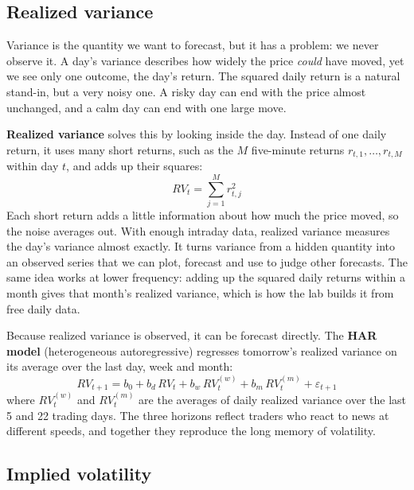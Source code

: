 \subsection{Realized variance}
\label{sec:10-rv}

Variance is the quantity we want to forecast, but it has a problem: we never observe it. A day's variance describes how widely the price \emph{could} have moved, yet we see only one outcome, the day's return. The squared daily return is a natural stand-in, but a very noisy one. A risky day can end with the price almost unchanged, and a calm day can end with one large move.

\textbf{Realized variance} solves this by looking inside the day. Instead of one daily return, it uses many short returns, such as the $M$ five-minute returns $r_{t,1}, \dots, r_{t,M}$ within day $t$, and adds up their squares:
\begin{equation}
  RV_t = \sum_{j=1}^{M} r^2_{t,j}
  \label{eq:10-rv}
\end{equation}
Each short return adds a little information about how much the price moved, so the noise averages out. With enough intraday data, realized variance measures the day's variance almost exactly. It turns variance from a hidden quantity into an observed series that we can plot, forecast and use to judge other forecasts. The same idea works at lower frequency: adding up the squared daily returns within a month gives that month's realized variance, which is how the lab builds it from free daily data.

Because realized variance is observed, it can be forecast directly. The \textbf{HAR model} (heterogeneous autoregressive) regresses tomorrow's realized variance on its average over the last day, week and month:
\begin{equation}
  RV_{t+1} = b_0 + b_d\,RV_t + b_w\,RV^{(w)}_t + b_m\,RV^{(m)}_t + \varepsilon_{t+1}
  \label{eq:10-har}
\end{equation}
where $RV^{(w)}_t$ and $RV^{(m)}_t$ are the averages of daily realized variance over the last 5 and 22 trading days. The three horizons reflect traders who react to news at different speeds, and together they reproduce the long memory of volatility.


\subsection{Implied volatility}
\label{sec:10-iv}

